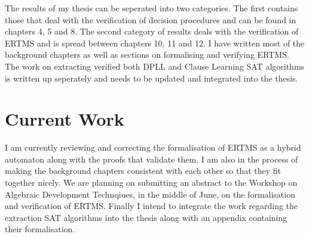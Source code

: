 \documentclass{article}
\begin{document}
The results of my thesis can be seperated into two categories. The first contains those that deal with the verification of decision procedures and can be found in chapters 4, 5 and 8. The second category of results deals with the verification of ERTMS and is spread between chapters 10, 11 and 12. I have written most of the background chapters as well as sections on formalising and verifying ERTMS. The work on extracting verified both DPLL and Clause Learning SAT algorithms is written up seperately and needs to be updated and integrated into the thesis.

\section{Current Work}
I am currently reviewing and correcting the formalisation of ERTMS as a hybrid automaton along with the proofs that validate them. I am also in the process of making the background chapters consistent with each other so that they fit together nicely. We are planning on submitting an abstract to the Workshop on Algebraic Development Technqiues, in the middle of June, on the formalisation and verification of ERTMS. Finally I intend to integrate the work regarding the extraction SAT algorithms into the thesis along with an appendix containing their formalisation.
 
\end{document}
